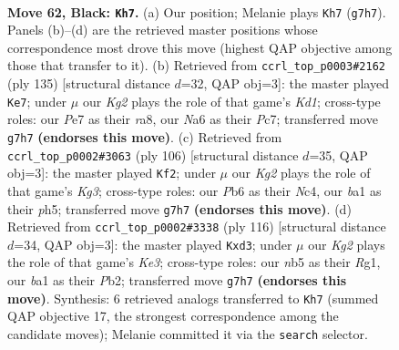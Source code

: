 \documentclass[11pt]{article}
\begin{document}
\clearpage

\begin{figure}[p]\centering
\begin{subfigure}{0.46\textwidth}\centering
\resizebox{\linewidth}{!}{%
\newchessgame
\chessboard[
  setfen={8/4p1k1/npr5/pN4p1/P1p5/2P3K1/3R4/B7 b - - 5 62},
  showmover=false,
  pgfstyle=straightmove, color=movearrow, markmove={g7-h7}
]}
\caption{}
\end{subfigure}\hfill
\begin{subfigure}{0.46\textwidth}\centering
\resizebox{\linewidth}{!}{%
\newchessgame
\chessboard[
  setfen={R2k4/2p5/5rp1/2N1p2p/1Pb1P2P/6P1/1K6/8 b - - 15 68},
  showmover=false,
  pgfstyle=straightmove, color=movearrow, markmove={d8-e7}
]}
\caption{}
\end{subfigure}
\\[4pt]
\begin{subfigure}{0.46\textwidth}\centering
\resizebox{\linewidth}{!}{%
\newchessgame
\chessboard[
  setfen={8/6k1/2n3p1/6Pp/2N1R2P/1p4K1/1P6/3r4 w - - 9 54},
  showmover=false,
  pgfstyle=straightmove, color=movearrow, markmove={g3-f2}
]}
\caption{}
\end{subfigure}\hfill
\begin{subfigure}{0.46\textwidth}\centering
\resizebox{\linewidth}{!}{%
\newchessgame
\chessboard[
  setfen={6r1/1p1k4/4p3/p3P1n1/6PN/1P1pK3/1P6/6R1 w - - 3 59},
  showmover=false,
  pgfstyle=straightmove, color=movearrow, markmove={e3-d3}
]}
\caption{}
\end{subfigure}
\caption{\textbf{Move 62, Black: \texttt{Kh7}.} (a) Our position; Melanie plays \texttt{Kh7} (\texttt{g7h7}). Panels (b)--(d) are the retrieved master positions whose correspondence most drove this move (highest QAP objective among those that transfer to it). (b) Retrieved from \texttt{ccrl\_top\_p0003\#2162} (ply 135) [structural distance $d$=32, QAP obj=3]: the master played \texttt{Ke7}; under $\mu$ our \emph{Kg2} plays the role of that game's \emph{Kd1}; cross-type roles: our \emph{P}e7 as their \emph{r}a8, our \emph{N}a6 as their \emph{P}c7; transferred move \texttt{g7h7} \textbf{(endorses this move)}. (c) Retrieved from \texttt{ccrl\_top\_p0002\#3063} (ply 106) [structural distance $d$=35, QAP obj=3]: the master played \texttt{Kf2}; under $\mu$ our \emph{Kg2} plays the role of that game's \emph{Kg3}; cross-type roles: our \emph{P}b6 as their \emph{N}c4, our \emph{b}a1 as their \emph{p}h5; transferred move \texttt{g7h7} \textbf{(endorses this move)}. (d) Retrieved from \texttt{ccrl\_top\_p0002\#3338} (ply 116) [structural distance $d$=34, QAP obj=3]: the master played \texttt{Kxd3}; under $\mu$ our \emph{Kg2} plays the role of that game's \emph{Ke3}; cross-type roles: our \emph{n}b5 as their \emph{R}g1, our \emph{b}a1 as their \emph{P}b2; transferred move \texttt{g7h7} \textbf{(endorses this move)}. Synthesis: 6 retrieved analogs transferred to \texttt{Kh7} (summed QAP objective 17, the strongest correspondence among the candidate moves); Melanie committed it via the \texttt{search} selector.}
\label{fig:thought-m123}
\end{figure}
\end{document}
